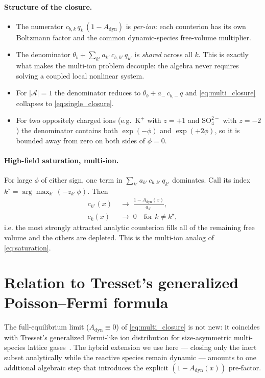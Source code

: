 \documentclass[11pt]{article}
\newcommand{\anset}{\mathcal{A}}       %
\begin{document}
\paragraph{Structure of the closure.}
\begin{itemize}
\item The numerator $c_{b,k}\,q_k\,(1-A_{\mathrm{dyn}})$ is
\emph{per-ion}: each counterion has its own Boltzmann factor and the
common dynamic-species free-volume multiplier.
\item The denominator
$\theta_b + \sum_{k'} a_{k'}\,c_{b,k'}\,q_{k'}$ is \emph{shared} across
all $k$. This is exactly what makes the multi-ion problem decouple:
the algebra never requires solving a coupled local nonlinear system.
\item For $|\anset| = 1$ the denominator reduces to
$\theta_b + a_-\,c_{b,-}\,q$ and \eqref{eq:multi_closure} collapses to
\eqref{eq:single_closure}.
\item For two oppositely charged ions (e.g.\ $\mathrm{K}^+$ with
$z=+1$ and $\mathrm{SO}_4^{2-}$ with $z=-2$) the denominator contains
both $\exp(-\phi)$ and $\exp(+2\phi)$, so it is bounded away from zero
on both sides of $\phi = 0$.
\end{itemize}

\paragraph{High-field saturation, multi-ion.}
For large $\phi$ of either sign, one term in
$\sum_{k'} a_{k'}\,c_{b,k'}\,q_{k'}$ dominates. Call its index
$k^\star = \arg\max_{k'} (-z_{k'}\,\phi)$. Then
\begin{align}
c_{k^\star}(x) &\;\longrightarrow\;
   \frac{1 - A_{\mathrm{dyn}}(x)}{a_{k^\star}}, \\
c_k(x) &\;\longrightarrow\; 0
\quad \text{for } k\neq k^\star,
\end{align}
i.e. the most strongly attracted analytic counterion fills all of the
remaining free volume and the others are depleted. This is the multi-ion
analog of \eqref{eq:saturation}.

\section{Relation to Tresset's generalized Poisson--Fermi formula}
\label{sec:tresset}

The full-equilibrium limit ($A_{\mathrm{dyn}} \equiv 0$) of
\eqref{eq:multi_closure} is not new: it coincides with Tresset's
generalized Fermi-like ion distribution for size-asymmetric
multi-species lattice gases~\cite[Eq.~(19), page 061506-4]{Tresset2008}.
The hybrid extension we use here --- closing only the inert subset
analytically while the reactive species remain dynamic --- amounts to
one additional algebraic step that introduces the explicit
$(1 - A_{\mathrm{dyn}}(x))$ pre-factor.
\end{document}

